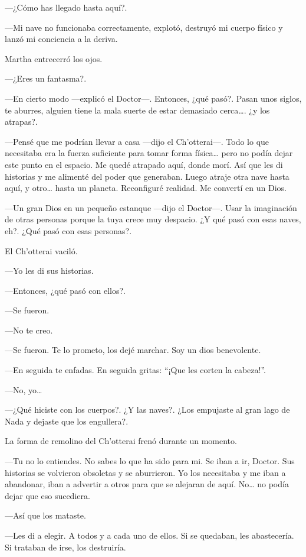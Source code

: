 ---¿Cómo has llegado hasta aquí?.

---Mi nave no funcionaba correctamente, explotó, destruyó mi cuerpo físico y lanzó mi conciencia a la deriva.

Martha entrecerró los ojos.

---¿Eres un fantasma?.

---En cierto modo ---explicó el Doctor---. Entonces, ¿qué pasó?. Pasan unos siglos, te aburres, alguien tiene la mala suerte de estar demasiado cerca\ldots{}. ¿y los atrapas?.

---Pensé que me podrían llevar a casa ---dijo el Ch'otterai---. Todo lo que necesitaba era la fuerza suficiente para tomar forma física\ldots{} pero no podía dejar este punto en el espacio. Me quedé atrapado aquí, donde morí. Así que les di historias y me alimenté del poder que generaban. Luego atraje otra nave hasta aquí, y otro\ldots{} hasta un planeta. Reconfiguré realidad. Me convertí en un Dios.

---Un gran Dios en un pequeño estanque ---dijo el Doctor---. Usar la imaginación de otras personas porque la tuya crece muy despacio. ¿Y qué pasó con esas naves, eh?. ¿Qué pasó con esas personas?.

El Ch'otterai vaciló.

---Yo les di sus historias.

---Entonces, ¿qué pasó con ellos?.

---Se fueron.

---No te creo.

---Se fueron. Te lo prometo, los dejé marchar. Soy un dios benevolente.

---En seguida te enfadas. En seguida gritas: ``¡Que les corten la cabeza!''.

---No, yo\ldots{}

---¿Qué hiciste con los cuerpos?. ¿Y las naves?. ¿Los empujaste al gran lago de Nada y dejaste que los engullera?.

La forma de remolino del Ch'otterai frenó durante un momento.

---Tu no lo entiendes. No sabes lo que ha sido para mi. Se iban a ir, Doctor. Sus historias se volvieron obsoletas y se aburrieron. Yo los necesitaba y me iban a abandonar, iban a advertir a otros para que se alejaran de aquí. No\ldots{} no podía dejar que eso sucediera.

---Así que los mataste.

---Les di a elegir. A todos y a cada uno de ellos. Si se quedaban, les abastecería. Si trataban de irse, los destruiría.

